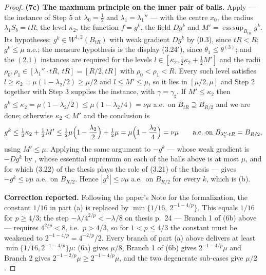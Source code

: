 \begin{proof}
\textbf{(7c) The maximum principle on the inner pair of balls.}  Apply
 --- the instance of Step 5 at
$\lambda_0=\tfrac12$ and $\lambda_1=\lambda_1''$ --- with the centre $x_0$, the
radius $\lambda_1S_b=tR$, the level $\kappa_2$, the function $f=g^k$, the field
$Dg^k$ and $M'=\operatorname{ess\,sup}_{B_{tR}}g^k$.  Its hypotheses:
$g^k\in W^{1,2}(B_{tR})$ with weak gradient $Dg^k$ by (0.3), since $tR<R$;
$g^k\le\mu$ a.e.; the measure hypothesis is the display (3.24$'$), since
$\theta_1\le\theta^{(3)}$; and the $(2.1)$ instances are required for the levels
$l\in[\kappa_2,\tfrac12\kappa_2+\tfrac12M']$ and the radii
$\rho_0,\rho_1\in[\lambda_1''\cdot tR,\,tR]=[R/2,tR]$ with $\rho_0<\rho_1<R$.
Every such level satisfies $l\ge\kappa_2=\mu(1-\lambda_2/2)\ge\mu/2$ and
$l\le M'\le\mu$, so it lies in $[\mu/2,\mu]$ and Step 2 together with Step 3
supplies the instance, with $\gamma=\gamma_\sharp$.  If $M'\le\kappa_2$ then
$g^k\le\kappa_2=\mu(1-\lambda_2/2)\le\mu(1-\lambda_2/4)=\nu\mu$ a.e.\ on
$B_{tR}\supseteq B_{R/2}$ and we are done; otherwise $\kappa_2<M'$ and the
conclusion is
\[
g^k\le\tfrac12\kappa_2+\tfrac12M'
\le\tfrac12\mu\Bigl(1-\frac{\lambda_2}2\Bigr)+\tfrac12\mu
=\mu\Bigl(1-\frac{\lambda_2}4\Bigr)=\nu\mu
\qquad\text{a.e.\ on }B_{\lambda_1''\cdot tR}=B_{R/2},
\]
using $M'\le\mu$.  Applying the same argument to $-g^k$ --- whose weak gradient
is $-Dg^k$ by , whose essential supremum on each of
the balls above is at most $\mu$, and for which (3.22) of the thesis plays the role of
(3.21) of the thesis --- gives $-g^k\le\nu\mu$ a.e.\ on $B_{R/2}$.  Hence
$|g^k|\le\nu\mu$ a.e.\ on $B_{R/2}$ for every $k$, which is (b).

\medskip
\noindent\textbf{Correction reported.}  Following the paper's Note for the
formalization, the constant $1/16$ in part (a) is replaced by
$\min\{1/16,\ 2^{-1-4/p}\}$.  This equals $1/16$ for $p\ge4/3$; the step
$-\lambda/4^{2/p}<-\lambda/8$ on thesis p.~24 --- Branch 1 of (6b) above ---
requires $4^{2/p}<8$, i.e.\ $p>4/3$, so for $1<p\le4/3$ the constant must be
weakened to $2^{-1-4/p}=4^{-2/p}/2$.  Every branch of part (a) above delivers at
least $\min\{1/16,2^{-1-4/p}\}\mu$: (6a) gives $\mu/8$, Branch 1 of (6b) gives
$2^{-1-4/p}\mu$ and Branch 2 gives $2^{-1-2/p}\mu\ge2^{-1-4/p}\mu$, and the two
degenerate sub-cases give $\mu/2$.
\end{proof}
